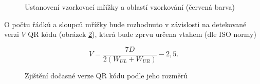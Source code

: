 \begin{figure}[H]
  \begin{center}
    \caption{Ustanovení vzorkovací mřížky a oblastí vzorkování (červená barva)}
    \label{SamplingGrid}
  \end{center}
\end{figure}

O počtu řádků a sloupců mřížky bude rozhodnuto v závislosti na detekované verzi
$V$ QR kódu (obrázek \ref{DeterminingTheVersionOfQRCode}), která bude zprvu určena
vtahem (dle ISO normy)

\begin{equation}
  V = \frac{7 D}{2 (W_{UL} + W_{UR})} - 2,5\mbox{.}
\end{equation}

\begin{figure}[H]
  \begin{center}
    \caption{Zjištění dočasné verze QR kódu podle jeho rozměrů}
    \label{DeterminingTheVersionOfQRCode}
  \end{center}
\end{figure}

